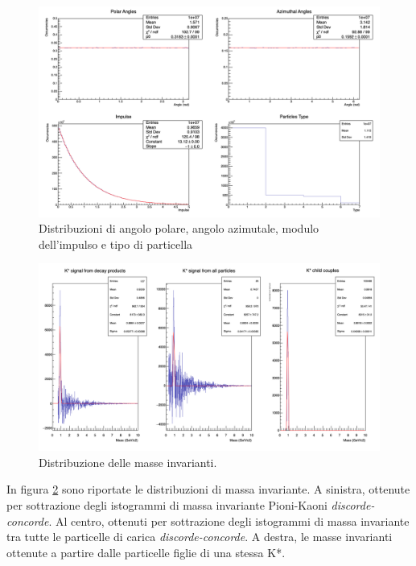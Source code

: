 \documentclass[12pt, a4paper]{article}
\begin{document}
\begin{figure}[H]
\centering
\includegraphics[scale=0.4]{images/DistributionsCanvas.png}

\label{fig:fig1}
\caption{Distribuzioni di angolo polare, angolo azimutale, modulo dell'impulso e tipo di particella}
\end{figure}

\begin{figure}[H]
\centering
\includegraphics[scale=0.4]{images/SignalCanvas.png}

\label{fig:fig2}
\caption{Distribuzione delle masse invarianti.}
\end{figure}

In figura \ref{fig:fig2} sono riportate le distribuzioni di massa invariante. A sinistra, ottenute per sottrazione degli istogrammi di massa invariante Pioni-Kaoni \textit{discorde-concorde}. Al centro, ottenuti per sottrazione degli istogrammi di massa invariante tra tutte le particelle di carica \textit{discorde-concorde}. A destra, le masse invarianti ottenute a partire dalle particelle figlie di una stessa K*.
\end{document}
